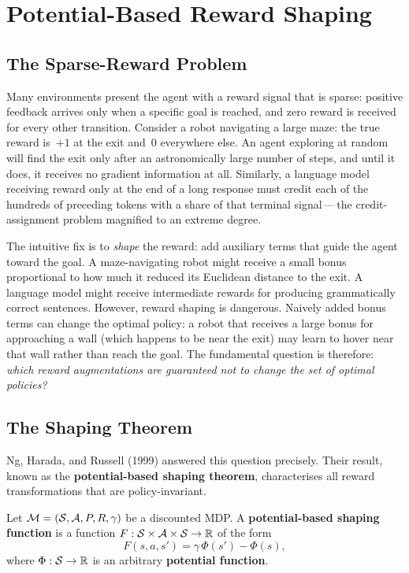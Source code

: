 \section{Potential-Based Reward Shaping}
\label{sec:reward-shaping}

\subsection{The Sparse-Reward Problem}

Many environments present the agent with a reward signal that is sparse: positive feedback arrives only when a specific goal is reached, and zero reward is received for every other transition. Consider a robot navigating a large maze: the true reward is~$+1$ at the exit and~$0$ everywhere else. An agent exploring at random will find the exit only after an astronomically large number of steps, and until it does, it receives no gradient information at all. Similarly, a language model receiving reward only at the end of a long response must credit each of the hundreds of preceding tokens with a share of that terminal signal\,---\,the credit-assignment problem magnified to an extreme degree.

The intuitive fix is to \emph{shape} the reward: add auxiliary terms that guide the agent toward the goal. A maze-navigating robot might receive a small bonus proportional to how much it reduced its Euclidean distance to the exit. A language model might receive intermediate rewards for producing grammatically correct sentences. However, reward shaping is dangerous. Naively added bonus terms can change the optimal policy: a robot that receives a large bonus for approaching a wall (which happens to be near the exit) may learn to hover near that wall rather than reach the goal. The fundamental question is therefore: \emph{which reward augmentations are guaranteed not to change the set of optimal policies?}

\subsection{The Shaping Theorem}

Ng, Harada, and Russell (1999) answered this question precisely. Their result, known as the \textbf{potential-based shaping theorem}, characterises all reward transformations that are policy-invariant.

\begin{definition}
\label{def:shaping-function}
Let $\mathcal{M} = (\mathcal{S}, \mathcal{A}, P, R, \gamma)$ be a discounted MDP. A \textbf{potential-based shaping function} is a function $F : \mathcal{S} \times \mathcal{A} \times \mathcal{S} \to \mathbb{R}$ of the form
\begin{equation}
\label{eq:shaping-F}
F(s, a, s') = \gamma\,\Phi(s') - \Phi(s),
\end{equation}
where $\Phi : \mathcal{S} \to \mathbb{R}$ is an arbitrary \textbf{potential function}.
\end{definition}

